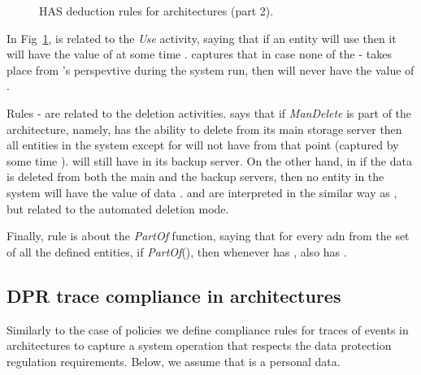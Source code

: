 \documentclass[a4paper]{article}
\begin{document}
\begin{figure}[htbp]
\centering
\fbox{\begin{minipage}{11.87 cm}
\begin{tabbing}
\\\\\\
\\\\\\

\\\\\\
\\\\\\
\\\\\\
\\\\\\
\\
\end{tabbing}
\end{minipage}
}
\caption{HAS deduction rules for architectures (part 2).}
\label{tab:eq:axioms1}
\end{figure}

In Fig~\ref{tab:eq:axioms1},  is related to the \textit{Use} activity, saying that if an entity  will use  then it will have the value of  at some time .  captures that in case none of the - takes place from 's perspevtive during the system run, then  will never have the value of . 
    
Rules - are related to the deletion activities.  says that if \textit{ManDelete} is part of the architecture, namely,  has the ability to delete  from its main storage server then all entities in the system except for  will not have  from that point (captured by some time ).  will still have  in its backup server. On the other hand, in  if the data is deleted from both the main and the backup servers, then no entity in the system will have the value of data .  and  are interpreted in the similar way as  , but related to the automated deletion mode.    

Finally, rule  is about the \textit{PartOf} function, saying that for every  adn  from the set of all the defined entities, if   \textit{PartOf}(), then whenever  has ,  also has .


\subsection{DPR trace compliance in architectures}
\label{tracesarch}
Similarly to the case of policies we define compliance rules for traces of events in architectures to capture a system operation that respects the data protection regulation requirements. Below, we assume that  is a personal data.  
\end{document}
